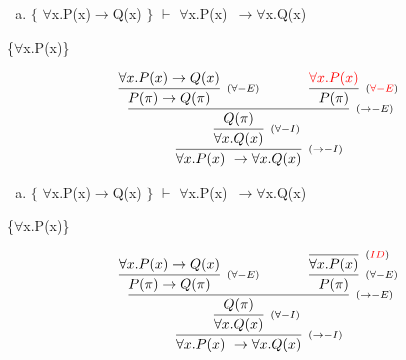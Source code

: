 \documentclass[aspectratio=43]{beamer}
\newcommand{\ria}{$\rightarrow$}
\newcommand{\fall}{$\forall$}
\begin{document}
    \begin{frame}[fragile]
    
    	\begin{enumerate}[f)]
			\item $\{$ \fall x.P(x)\ria Q(x) $\}$ $\vdash$ \fall x.P(x)\ \ria \fall x.Q(x) \\
		\end{enumerate}
        \{\fall x.P(x)\}
        \vspace{40pt}
        
        \[
        \begin{array}{c}
		
        	\infer[_{(\to -I)}]
            	{\forall x.P(x)\ \to \forall x.Q(x)}
            	{\infer[_{(\forall -I)}] 
                	{\forall x.Q(x)}
                    {\infer[_{(\to -E)}]
                    	{Q(\pi)}
                        {\infer[_{(\forall -E)}]
                        	{P(\pi)\rightarrow Q(\pi)}
                            {\forall x.P(x)\to Q(x)}
                        \hspace{35pt} 
                        \infer[_{(\textcolor{red}{\forall -E})}] 
                        	{P(\pi)}
                            {\textcolor{red}{\forall x.P(x)}}
                        }
                    }
                 }   
        
		\end{array}
        \]
        
	\end{frame}
    
    \begin{frame}[fragile]
    
    	\begin{enumerate}[f)]
			\item $\{$ \fall x.P(x)\ria Q(x) $\}$ $\vdash$ \fall x.P(x)\ \ria \fall x.Q(x) \\
		\end{enumerate}
        \{\fall x.P(x)\}
        \vspace{40pt}
        
        \[
        \begin{array}{c}
		
        	\infer[_{(\to -I)}]
            	{\forall x.P(x)\ \to \forall x.Q(x)}
            	{\infer[_{(\forall -I)}] 
                	{\forall x.Q(x)}
                    {\infer[_{(\to -E)}]
                    	{Q(\pi)}
                        {\infer[_{(\forall -E)}]
                        	{P(\pi)\rightarrow Q(\pi)}
                            {\forall x.P(x)\to Q(x)}
                        \hspace{35pt} 
                        \infer[_{(\forall -E)}] 
                        	{P(\pi)}
                            {\infer[_{(\textcolor{red}{ID})}]
                            	{\forall x.P(x)}
                                {}
                            }
                        }
                    }
                 }   
        
		\end{array}
        \]
        
	\end{frame}
    
\end{document}
